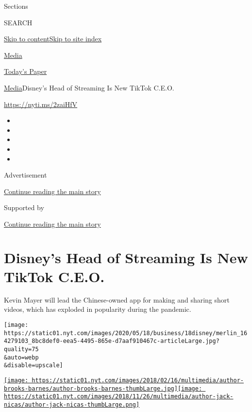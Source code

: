 Sections

SEARCH

\protect\hyperlink{site-content}{Skip to
content}\protect\hyperlink{site-index}{Skip to site index}

\href{https://www.nytimes.com/section/business/media}{Media}

\href{https://myaccount.nytimes.com/auth/login?response_type=cookie\&client_id=vi}{}

\href{https://www.nytimes.com/section/todayspaper}{Today's Paper}

\href{/section/business/media}{Media}\textbar{}Disney's Head of
Streaming Is New TikTok C.E.O.

\url{https://nyti.ms/2zaiHfV}

\begin{itemize}
\item
\item
\item
\item
\item
\end{itemize}

Advertisement

\protect\hyperlink{after-top}{Continue reading the main story}

Supported by

\protect\hyperlink{after-sponsor}{Continue reading the main story}

\hypertarget{disneys-head-of-streaming-is-new-tiktok-ceo}{%
\section{Disney's Head of Streaming Is New TikTok
C.E.O.}\label{disneys-head-of-streaming-is-new-tiktok-ceo}}

Kevin Mayer will lead the Chinese-owned app for making and sharing short
videos, which has exploded in popularity during the pandemic.

\texttt{[image: https://static01.nyt.com/images/2020/05/18/business/18disney/merlin\_164279103\_8bc8def0-eea5-4495-865e-d7aaf910467c-articleLarge.jpg?quality=75\\\&auto=webp\\\&disable=upscale]}

\href{https://www.nytimes.com/by/brooks-barnes}{\texttt{[image: https://static01.nyt.com/images/2018/02/16/multimedia/author-brooks-barnes/author-brooks-barnes-thumbLarge.jpg]}}\href{https://www.nytimes.com/by/jack-nicas}{\texttt{[image: https://static01.nyt.com/images/2018/11/26/multimedia/author-jack-nicas/author-jack-nicas-thumbLarge.png]}}

